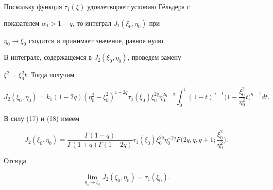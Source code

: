 Поскольку функция $\tau_1(\xi)$ удовлетворяет условию Г\"ельдера с 


показателем $\alpha_1>1-q$, то интеграл $J_1(\xi_0,\eta_0)$ при 


$\eta_0\to \xi_0$ сходится и принимает значение, равное нулю.


В интеграле, содержащемся в $J_2(\xi_0,\eta_0)$, проведем замену


$\xi^2=\xi_0^2 t$. Тогда получим


$$


J_2(\xi_0,\eta_0)=


k_1(1-2q)(\eta_0^2-\xi_0^2)^{1-2q} \tau_1(\xi_0) \xi_0^{2q} \eta_0^{2q-2}


\int_0^1 (1-t)^{q-1} \bigg(1-\frac{\xi_0^2}{\eta_0^2}t\bigg)^{q-1} dt.


$$


В силу (17) и (18) имеем 


$$


J_2(\xi_0,\eta_0)=


\frac{\Gamma(1-q)}{\Gamma(1+q)\Gamma(1-2q)} \tau_1(\xi_0) \xi_0^{2q} 


\eta_0^{-2q} F\bigg(2q,q,q+1;\frac{\xi_0^2}{\eta_0^2}\bigg).


$$


Отсюда


$$


\lim_{\eta_0 \to \xi_0 } J_2(\xi_0,\eta_0)=\tau_1(\xi_0).


$$





